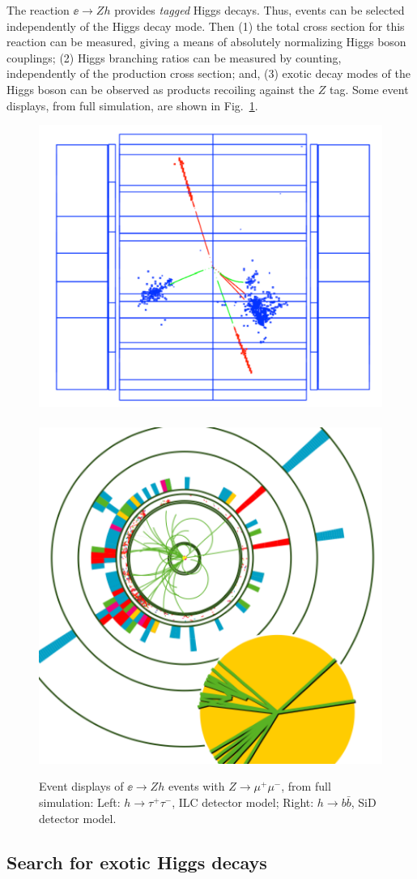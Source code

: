 The reaction $\ee\to Zh$ provides {\it tagged} Higgs decays.   Thus, events can be selected independently of the Higgs decay mode.  Then (1) the  total cross section for this reaction can be measured, giving a means of absolutely normalizing Higgs boson couplings; (2)  Higgs branching ratios can be measured  by counting, independently of the production cross section; and, (3)  exotic decay modes of the Higgs boson can be observed as products recoiling against the $Z$ tag.   Some event displays, from full 
simulation, are shown in Fig.~\ref{fig:HiggsEvents}. 

\begin{figure}
\begin{center}
\includegraphics[width=0.5\hsize]{chapters/figures/htotautau.pdf}\ \ 
\includegraphics[width=0.40\hsize]{chapters/figures/htobb.pdf}
\end{center}
\caption{Event displays of $\ee\to Zh$ events  with $Z\to \mu^+\mu^-$, from full simulation: Left: $h\to \tau^+\tau^-$, ILC detector model;  Right: $h\to b\bar b$, SiD detector model.}
\label{fig:HiggsEvents}
\end{figure}

\subsection{Search for exotic Higgs decays}


